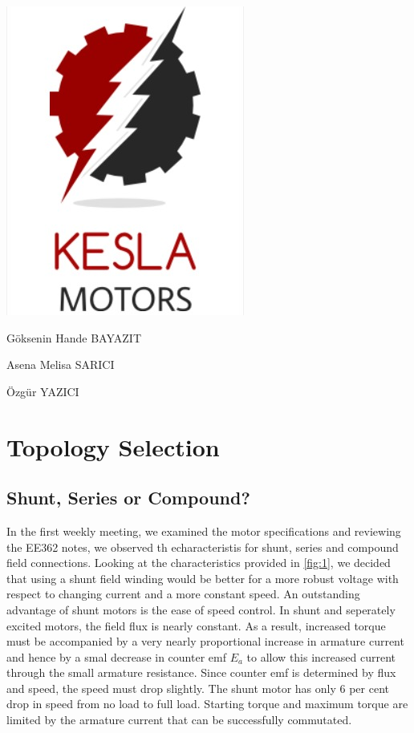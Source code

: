 \documentclass[10pt,a4paper]{article}
\begin{document}
\begin{titlepage}
\centering


\includegraphics[scale=0.8]{Logo.PNG} \par

\LARGE
\vspace{2cm}
{Göksenin Hande BAYAZIT\par Asena Melisa SARICI\par Özgür YAZICI}


\end{titlepage}

\newpage

\section*{Topology Selection}

\subsection*{Shunt, Series or Compound?}
In the first weekly meeting, we examined the motor specifications and reviewing the EE362 notes, we observed th echaracteristis for shunt, series and compound field connections. Looking at the characteristics provided in \ref{fig:1}, we decided that using a shunt field winding would be better for a more robust voltage with respect to changing current and a more constant speed.  An outstanding advantage of shunt motors is the ease of speed control.  In shunt and seperately excited motors, the field flux is nearly constant. As a result, increased torque must be accompanied by a very nearly proportional increase in armature current and hence by a smal decrease in counter emf $E_{a}$ to allow this increased current through the small armature resistance.  Since counter emf is determined by flux and speed, the speed must drop slightly. The shunt motor has only 6 per cent drop in speed from no load to full load. Starting torque and maximum torque are limited by the armature current that can be successfully commutated.
\end{document}
